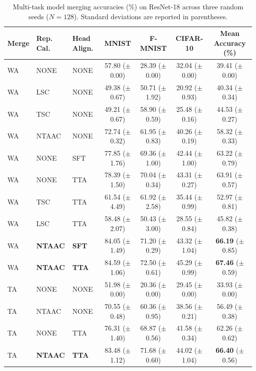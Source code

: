 \documentclass{article}
\theoremstyle{plain}
\theoremstyle{definition}
\theoremstyle{remark}
\begin{document}
\begin{table}[t]
  \caption{Multi-task model merging accuracies (\%) on ResNet-18 across three random seeds ($N=128$). Standard deviations are reported in parentheses.}
  \label{tab:main_results}
  \centering
  \small
  \begin{tabular}{lllcccc}
    \toprule
    Merge & Rep. Cal. & Head Align. & MNIST & F-MNIST & CIFAR-10 & Mean Accuracy (\%) \\
    \midrule
    WA & NONE & NONE & 57.80 ($\pm$0.00) & 28.39 ($\pm$0.00) & 32.04 ($\pm$0.00) & 39.41 ($\pm$0.00) \\
    WA & LSC  & NONE & 49.38 ($\pm$0.67) & 50.71 ($\pm$1.92) & 20.92 ($\pm$0.93) & 40.34 ($\pm$0.34) \\
    WA & TSC  & NONE & 49.21 ($\pm$0.67) & 58.90 ($\pm$0.59) & 25.48 ($\pm$0.16) & 44.53 ($\pm$0.27) \\
    WA & NTAAC & NONE & 72.74 ($\pm$0.32) & 61.95 ($\pm$0.83) & 40.26 ($\pm$0.19) & 58.32 ($\pm$0.33) \\
    \midrule
    WA & NONE & SFT  & 77.85 ($\pm$1.76) & 69.36 ($\pm$1.00) & 42.44 ($\pm$1.00) & 63.22 ($\pm$0.79) \\
    WA & NONE & TTA  & 78.39 ($\pm$1.50) & 70.04 ($\pm$0.34) & 43.31 ($\pm$0.27) & 63.91 ($\pm$0.57) \\
    WA & TSC  & TTA  & 61.54 ($\pm$4.49) & 61.92 ($\pm$2.58) & 35.44 ($\pm$0.99) & 52.97 ($\pm$0.81) \\
    WA & LSC  & TTA  & 58.48 ($\pm$2.07) & 50.43 ($\pm$3.00) & 28.55 ($\pm$0.84) & 45.82 ($\pm$0.38) \\
    \midrule
    WA & \textbf{NTAAC} & \textbf{SFT} & 84.05 ($\pm$1.49) & 71.20 ($\pm$0.29) & 43.32 ($\pm$1.04) & \textbf{66.19} ($\pm$0.85) \\
    WA & \textbf{NTAAC} & \textbf{TTA} & 84.59 ($\pm$1.06) & 72.50 ($\pm$0.61) & 45.29 ($\pm$0.99) & \textbf{67.46} ($\pm$0.59) \\
    \midrule
    TA & NONE & NONE & 51.98 ($\pm$0.00) & 20.36 ($\pm$0.00) & 29.45 ($\pm$0.00) & 33.93 ($\pm$0.00) \\
    TA & NTAAC & NONE & 70.55 ($\pm$0.48) & 60.36 ($\pm$0.95) & 38.56 ($\pm$0.21) & 56.49 ($\pm$0.38) \\
    TA & NONE & TTA  & 76.31 ($\pm$1.40) & 68.87 ($\pm$0.56) & 41.58 ($\pm$0.34) & 62.26 ($\pm$0.62) \\
    TA & \textbf{NTAAC} & \textbf{TTA} & 83.48 ($\pm$1.12) & 71.68 ($\pm$0.60) & 44.02 ($\pm$1.04) & \textbf{66.40} ($\pm$0.56) \\
    \bottomrule
  \end{tabular}
\end{table}
\end{document}
